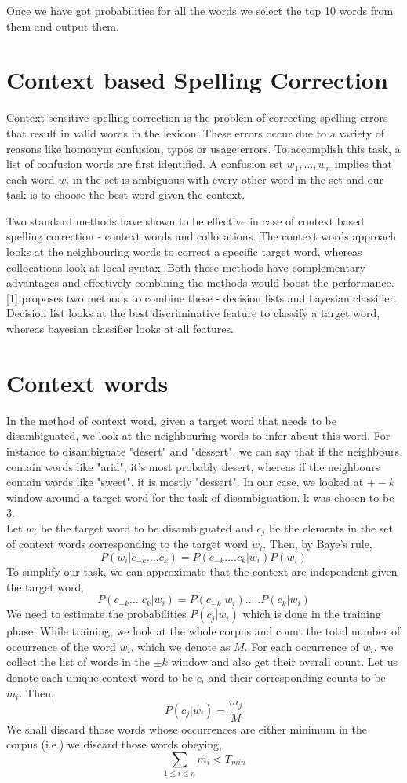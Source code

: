 \documentclass{article}
\begin{document}
Once we have got probabilities for all the words we select the top 10 words from them and output them.

\section{Context based Spelling Correction}
Context-sensitive spelling correction is the problem of correcting spelling errors that result in valid words in the lexicon. These errors occur due to a variety of reasons like homonym confusion, typos or usage errors. To accomplish this task, a list of confusion words are first identified. A confusion set ${w_{1},...,w_{n}}$ implies that each word $w_{i}$ in the set is ambiguous with every other word in the set and our task is to choose the best word given the context. 

Two standard methods have shown to be effective in case of context based spelling correction - context words and collocations. The context words approach looks at the neighbouring words to correct a specific target word, whereas collocations look at local syntax. Both these methods have complementary advantages and effectively combining the methods would boost the performance. [1] proposes two methods to combine these - decision lists and bayesian classifier. Decision list looks at the best discriminative feature to classify a target word, whereas bayesian classifier looks at all features.

\section{Context words}

In the method of context word, given a target word that needs to be disambiguated, we look at the neighbouring words to infer about this word. For instance to disambiguate "desert" and "dessert", we can say that if the neighbours contain words like "arid", it's most probably desert, whereas if the neighbours contain words like "sweet", it is mostly "dessert". In our case, we looked at $+- k$ window around a target word for the task of disambiguation. k was chosen to be $3$.
\\

Let $w_{i}$ be the target word to be disambiguated and $c_{j}$ be the elements in the set of context words corresponding to the target word $w_{i}$. Then, by Baye's rule,
\[
P(w_{i}|c_{-k}....c_{k}) = P(c_{-k}....c_{k}|w_{i})P(w_{i})
\]
To simplify our task, we can approximate that the context are independent given the target word.
\[
P(c_{-k}....c_{k}|w_{i}) = P(c_{-k}|w_{i}).....P(c_{k}|w_{i})
\]
We need to estimate the probabilities $P(c_{j}|w_{i})$ which is done in the training phase. While training, we look at the whole corpus and count the total number of occurrence of the word $w_{i}$, which we denote as $M$. For each occurrence of $w_{i}$, we collect the list of words in the $\pm k$ window and also get their overall count. Let us denote each unique context word to be $c_{i}$ and their corresponding counts to be $m_{i}$. Then,
\[
P(c_{j}|w_{i}) = \frac{m_{j}}{M}
\]
We shall discard those words whose occurrences are either minimum in the corpus (i.e.) we discard those words obeying,
\[
\sum_{1\leq i \leq n} m_{i} < T_{min} 
\] 
\end{document}
